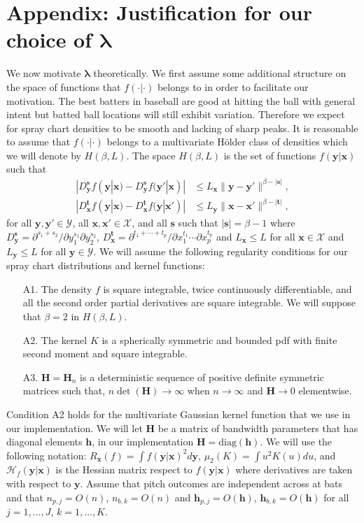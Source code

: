 \documentclass[11pt]{article}
\newcommand{\Y}{\mathcal{Y}}
\newcommand{\X}{\mathcal{X}}
\newcommand{\Hcal}{\mathcal{H}}
\newcommand{\Hbf}{\textbf{H}}
\newcommand{\y}{\textbf{y}}
\newcommand{\x}{\textbf{x}}
\newcommand{\h}{\textbf{h}}
\newcommand{\s}{\textbf{s}}
\newcommand{\tbf}{\textbf{t}}
\newcommand{\lambdabf}{\boldsymbol{\lambda}}
\begin{document}
\section*{Appendix: Justification for our choice of $\lambdabf$}

We now motivate $\lambdabf$ theoretically. We first assume some additional structure on the space of functions that $f(\cdot|\cdot)$ belongs to in order to facilitate our motivation. The best batters in baseball are good at hitting the ball with general intent but batted ball locations will still exhibit variation. Therefore we expect for spray chart densities to be smooth and lacking of sharp peaks. It is reasonable to assume that $f(\cdot|\cdot)$ belongs to a multivariate H{\"o}lder class of densities which we will denote by $H(\beta,L)$. The space $H(\beta,L)$ is the set of functions $f(\y|\x)$ such that 
\begin{align*}
|D_{\y}^\s f(\y|\x) - D_{\y}^\s f(\y'|\x)| &\leq L_\x\|\y - \y'\|^{\beta - |\s|}, \\
|D_{\x}^\tbf f(\y|\x) - D_{\x}^\tbf f(\y|\x')| &\leq L_\y\|\x - \x'\|^{\beta - |\tbf|}, 
\end{align*}
for all $\y,\y' \in \Y$, all $\x,\x' \in \X$, and all $\s$ such that $|\s| = \beta - 1$ where
$D_{\y}^\s = \partial^{s_1 + s_2}/\partial y_1^{s_1} \partial y_2^{s_2}$, 
$D_{\x}^\tbf = \partial^{t_1 + \cdots + t_p}/\partial x_1^{t_1} \cdots \partial x_p^{t_p}$ and $L_\x \leq L$ for all $\x \in \X$ and $L_\y \leq L$ for all $\y \in \Y$. 
We will assume the following regularity conditions for our spray chart distributions and kernel functions: 

\begin{itemize}
\item[A1.] The density $f$ is square integrable, twice continuously differentiable, and all the second order partial derivatives are square integrable. We will suppose that $\beta = 2$ in $H(\beta,L)$.
\item[A2.] The kernel $K$ is a spherically symmetric and bounded pdf with finite second moment and square integrable.
\item[A3.] $\Hbf = \Hbf_n$ is a deterministic sequence of positive definite symmetric matrices such that, $n\det(\Hbf) \to \infty$ when $n \to \infty$ and $\Hbf \to 0$ elementwise. 
\end{itemize}

Condition A2 holds for the multivariate Gaussian kernel function that we use in our implementation.
We will let $\Hbf$ be a matrix of bandwidth parameters that has diagonal elements $\h$, in our implementation $\Hbf = \text{diag}(\h)$. We will use the following notation: $R_{\x}(f) = \int f(\y|\x)^2 d\y$, $\mu_2(K) = \int u^2K(u)du$, and $\Hcal_f(\y|\x)$ is the Hessian matrix respect to $f(\y|\x)$ where derivatives are taken with respect to $\y$. Assume that pitch outcomes are independent across at bats and that $n_{p,j} = O(n)$, $n_{b,k} = O(n)$ and $\h_{p,j} = O(\h)$, $\h_{b,k} = O(\h)$ for all $j = 1, \ldots, J$, $k = 1, \ldots, K$. 
\end{document}
